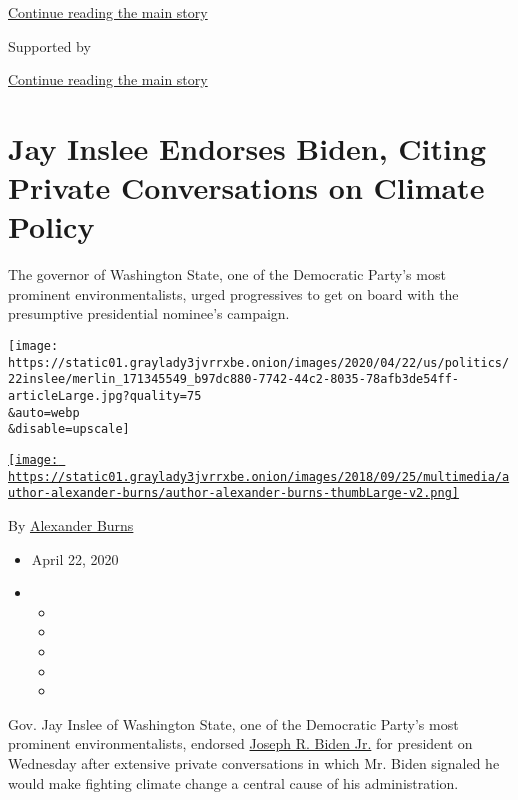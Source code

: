 \protect\hyperlink{after-top}{Continue reading the main story}

Supported by

\protect\hyperlink{after-sponsor}{Continue reading the main story}

\hypertarget{jay-inslee-endorses-biden-citing-private-conversations-on-climate-policy}{%
\section{Jay Inslee Endorses Biden, Citing Private Conversations on
Climate
Policy}\label{jay-inslee-endorses-biden-citing-private-conversations-on-climate-policy}}

The governor of Washington State, one of the Democratic Party's most
prominent environmentalists, urged progressives to get on board with the
presumptive presidential nominee's campaign.

\texttt{[image: https://static01.graylady3jvrrxbe.onion/images/2020/04/22/us/politics/22inslee/merlin\_171345549\_b97dc880-7742-44c2-8035-78afb3de54ff-articleLarge.jpg?quality=75\\\&auto=webp\\\&disable=upscale]}

\href{https://www.nytimes3xbfgragh.onion/by/alexander-burns}{\texttt{[image: https://static01.graylady3jvrrxbe.onion/images/2018/09/25/multimedia/author-alexander-burns/author-alexander-burns-thumbLarge-v2.png]}}

By
\href{https://www.nytimes3xbfgragh.onion/by/alexander-burns}{Alexander
Burns}

\begin{itemize}
\item
  April 22, 2020
\item
  \begin{itemize}
  \item
  \item
  \item
  \item
  \item
  \end{itemize}
\end{itemize}

Gov. Jay Inslee of Washington State, one of the Democratic Party's most
prominent environmentalists, endorsed
\href{https://www.nytimes3xbfgragh.onion/interactive/2020/us/elections/joe-biden.html}{Joseph
R. Biden Jr.} for president on Wednesday after extensive private
conversations in which Mr. Biden signaled he would make fighting climate
change a central cause of his administration.

